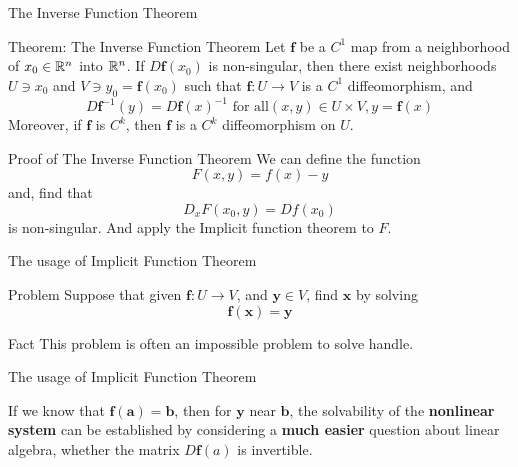 \begin{frame}{The Inverse Function Theorem}
    \begin{block}{Theorem: The Inverse Function Theorem}
        Let $\mathbf{f}$ be a $C^1$ map from a neighborhood of $x_0 \in \mathbb{R}^n$ into $\mathbb{R}^n$. If $D\mathbf{f}(x_0)$ is non-singular, then there exist neighborhoods $U \ni x_0$ and $V \ni y_0 = \mathbf{f}(x_0)$ such that $ \mathbf{f} : U \rightarrow V$ is a $C^1$ diffeomorphism\footnotemark, and 
        \begin{equation}
            D\mathbf{f}^{-1}(y) = D\mathbf{f}(x)^{-1} \text{ for all} (x, y) \in U \times V, y = \mathbf{f}(x)
        \end{equation}
        Moreover, if $\mathbf{f}$ is $C^k$, then $\mathbf{f}$ is a $C^k$ diffeomorphism on $U$.
    \end{block}
\end{frame}

\begin{frame}{Proof of The Inverse Function Theorem}
    We can define the function 
    \begin{equation}
        F(x, y) = f(x) - y
    \end{equation}
    and, find that
    \begin{equation}
        D_xF(x_0, y) = Df(x_0)
    \end{equation}
    is non-singular.
    \vspace{1cm}
    And apply the Implicit function theorem to $F$.
\end{frame}

\begin{frame}{The usage of Implicit Function Theorem}
    \begin{parchment}{Problem}
        Suppose that given $\mathbf{f}: U \rightarrow V$, and $\mathbf{y}  \in V$, find $\mathbf{x}$ by solving 
        \begin{equation}
            \mathbf{f}(\mathbf{x}) = \mathbf{y}
        \end{equation}
    \end{parchment}
    \begin{parchment}{Fact}
        This problem is often an impossible problem to solve handle.
    \end{parchment}
    
\end{frame}
\begin{frame}{The usage of Implicit Function Theorem}
    \begin{parchment}
        If we know that $\mathbf{f}(\mathbf{a}) = \mathbf{b}$, then for $\mathbf{y}$ near $\mathbf{b}$, the solvability of the \textbf{nonlinear system} can be established by considering a \textbf{much easier} question about linear algebra, whether the matrix $D\mathbf{f}(a)$ is invertible.
    \end{parchment}
\end{frame}

